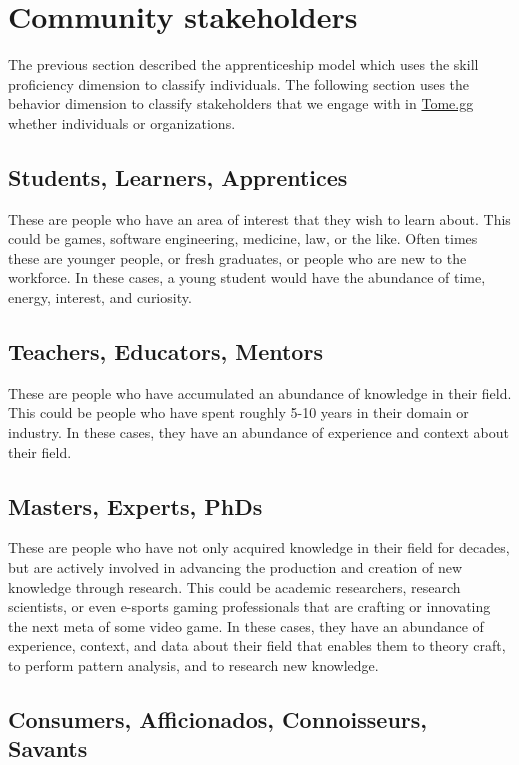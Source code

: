 \documentclass[journal, onecolumn]{IEEEtran}
\newcommand{\tomegg}{
  \href{http://tome.gg}{Tome.gg}
}
\begin{document}
\section{Community stakeholders}
\label{sec:stakeholders}

The previous section described the apprenticeship model which uses the 
skill proficiency dimension to classify individuals.
The following section uses the behavior dimension to classify stakeholders
that we engage with in \tomegg whether individuals or organizations.

\subsection{Students, Learners, Apprentices}

These are people who have an area of interest that they wish to learn
about. This could be games, software engineering, medicine, law, or the like.
Often times these are younger people, or fresh graduates, or people who are
new to the workforce. In these cases, a young student would have the abundance of 
time, energy, interest, and curiosity.

\subsection{Teachers, Educators, Mentors}

These are people who have accumulated an abundance of knowledge in their field.
This could be people who have spent roughly 5-10 years in their domain or industry.
In these cases, they have an abundance of experience and context about their
field.

\subsection{Masters, Experts, PhDs}

These are people who have not only acquired knowledge in their field for decades,
but are actively involved in advancing the production and creation of new 
knowledge through research. This could be academic researchers, research scientists,
or even e-sports gaming professionals that are crafting or innovating the next meta of 
some video game. In these cases, they have an abundance of experience, context, and
data about their field that enables them to theory craft, to perform pattern analysis,
and to research new knowledge.

\subsection{Consumers, Afficionados, Connoisseurs, Savants}
\end{document}
